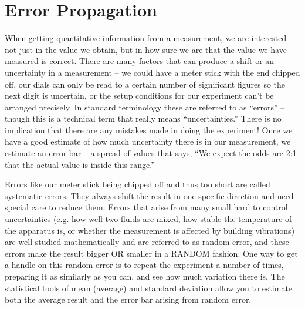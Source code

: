 \chapter{Error Propagation}
\thispagestyle{fancy}
%
When getting quantitative information from a measurement, we are interested not just in the value
we obtain, but in how sure we are that the value we have measured is correct.
There are many factors that can produce a shift or an uncertainty in a measurement – we could have a meter stick with the end chipped off, our dials can only be read to a certain number of significant figures so the next digit is uncertain, or the setup conditions for our experiment can't be arranged precisely. 
In standard terminology these are referred to as ``errors'' – though this is a technical term that really means ``uncertainties.'' 
There is no implication that there are any mistakes made in doing the experiment!
Once we have a good estimate of how much uncertainty there is in our measurement, we estimate an error bar – a spread of values that says, ``We expect the odds are 2:1 that the actual value is inside this range.''
\par
Errors like our meter stick being chipped off and thus too short are called systematic errors. 
They always shift the result in one specific direction and need special care to reduce them.
Errors that arise from many small hard to control uncertainties (e.g. how well two fluids are mixed, how stable the temperature of the apparatus is, or whether the measurement is affected by building vibrations) are well studied mathematically and are referred to as random error, and these errors make the result bigger OR smaller in a RANDOM fashion. 
One way to get a handle on this random error is to repeat the experiment a number of times, preparing it as similarly as you can, and see how much variation there is. 
The statistical tools of mean (average) and standard deviation allow you to estimate both the average result and the error bar arising from random error.

